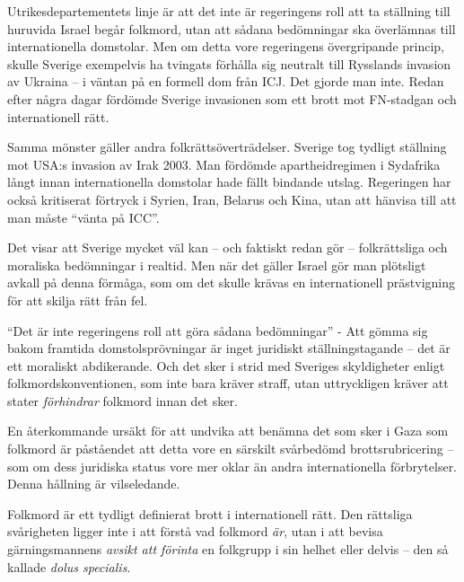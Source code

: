 \documentclass[12pt]{article}
\begin{document}
Utrikesdepartementets linje är att det inte är regeringens roll att ta ställning till huruvida Israel begår folkmord, utan att sådana bedömningar ska överlämnas till internationella domstolar. Men om detta vore regeringens övergripande princip, skulle Sverige exempelvis ha tvingats förhålla sig neutralt till Rysslands invasion av Ukraina – i väntan på en formell dom från ICJ. Det gjorde man inte. Redan efter några dagar fördömde Sverige invasionen som ett brott mot FN-stadgan och internationell rätt.  

Samma mönster gäller andra folkrättsöverträdelser. Sverige tog tydligt ställning mot USA:s invasion av Irak 2003. Man fördömde apartheidregimen i Sydafrika långt innan internationella domstolar hade fällt bindande utslag. Regeringen har också kritiserat förtryck i Syrien, Iran, Belarus och Kina, utan att hänvisa till att man måste “vänta på ICC”.

Det visar att Sverige mycket väl kan – och faktiskt redan gör – folkrättsliga och moraliska bedömningar i realtid. Men när det gäller Israel gör man plötsligt avkall på denna förmåga, som om det skulle krävas en internationell prästvigning för att skilja rätt från fel.

``Det är inte regeringens roll att göra sådana bedömningar'' - Att gömma sig bakom framtida domstolsprövningar är inget juridiskt ställningstagande – det är ett moraliskt abdikerande. Och det sker i strid med Sveriges skyldigheter enligt folkmordskonventionen, som inte bara kräver straff, utan uttryckligen kräver att stater \textit{förhindrar} folkmord innan det sker.





En återkommande ursäkt för att undvika att benämna det som sker i Gaza som folkmord är påståendet att detta vore en särskilt svårbedömd brottsrubricering – som om dess juridiska status vore mer oklar än andra internationella förbrytelser. Denna hållning är vilseledande.

Folkmord är ett tydligt definierat brott i internationell rätt. Den rättsliga svårigheten ligger inte i att förstå vad folkmord \textit{är}, utan i att bevisa gärningsmannens \textit{avsikt att förinta} en folkgrupp i sin helhet eller delvis – den så kallade \textit{dolus specialis}.
\end{document}
